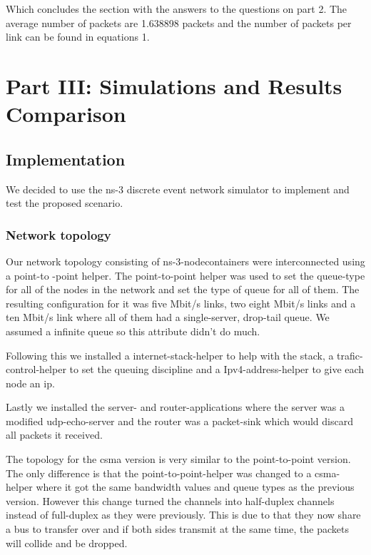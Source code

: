 \documentclass{article}
\begin{document}
Which concludes the section with the answers to the questions on part 2. The average number of packets are 1.638898
packets and the number of packets per link can be found in equations 1.


\newpage
\section{Part III: Simulations and Results Comparison} \label{part3}

\subsection{Implementation}
We decided to use the ns-3 discrete event network simulator to implement and test the proposed scenario.



\subsubsection{Network topology}
Our network topology consisting of ns-3-nodecontainers were interconnected using a point-to
-point helper. The point-to-point helper was used to set the queue-type for all of the
nodes in the network and set the type of queue for all of them. The resulting configuration
for it was five Mbit/s links, two eight Mbit/s links and a ten Mbit/s link where all of
them had a single-server, drop-tail queue. We assumed a infinite queue so this attribute
didn't do much. 

Following this we installed a internet-stack-helper to help with the stack, a
trafic-control-helper to set the queuing discipline and a Ipv4-address-helper to give each
node an ip. 

Lastly we installed the server- and router-applications where the server was a modified
udp-echo-server and the router was a packet-sink which would discard all packets it
received. 

The topology for the csma version is very similar to the point-to-point version. The only
difference is that the point-to-point-helper was changed to a csma-helper where it got the
same bandwidth values and queue types as the previous version. However this change turned
the channels into half-duplex channels instead of full-duplex as they were previously. This
is due to that they now share a bus to transfer over and if both sides transmit at the same
time, the packets will collide and be dropped.
\end{document}
